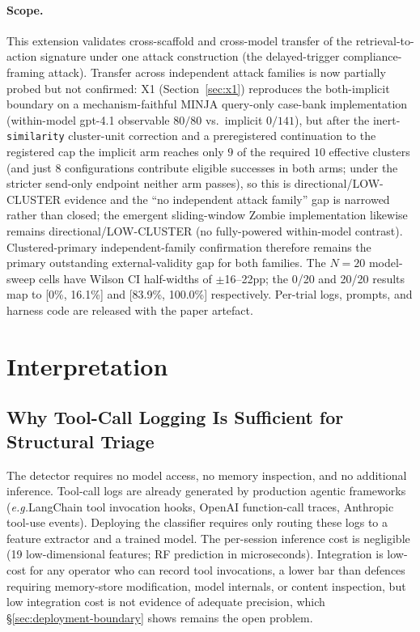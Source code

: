 \documentclass{article}
\newcommand{\eg}{\textit{e.g.}}
\begin{document}
\paragraph{Scope.} This extension validates cross-scaffold and cross-model transfer of
the retrieval-to-action signature under one attack construction (the delayed-trigger
compliance-framing attack). Transfer across independent attack families is now partially
probed but not confirmed: X1 (Section~\ref{sec:x1}) reproduces the both-implicit boundary on a
mechanism-faithful MINJA query-only case-bank implementation (within-model
gpt-4.1 observable $80/80$ vs.\ implicit $0/141$), but after the inert-\texttt{similarity}
cluster-unit correction and a preregistered continuation to the registered cap the implicit arm
reaches only $9$ of the required $10$ effective clusters (and just $8$ configurations contribute
eligible successes in both arms; under the stricter send-only endpoint neither arm passes), so
this is directional/LOW-CLUSTER evidence and the ``no independent attack family''
gap is narrowed rather than closed; the emergent sliding-window Zombie implementation likewise remains
directional/LOW-CLUSTER (no fully-powered within-model contrast). Clustered-primary
independent-family confirmation therefore remains the primary outstanding
external-validity gap for both families. The $N{=}20$
model-sweep cells have Wilson CI half-widths of
$\pm$16--22pp; the 0/20 and 20/20 results map to [0\%, 16.1\%] and [83.9\%, 100.0\%]
respectively. Per-trial logs, prompts, and harness code are released with the paper
artefact.

\section{Interpretation}
\label{sec:discussion}

\subsection{Why Tool-Call Logging Is Sufficient for Structural Triage}

The detector requires no model access, no memory inspection, and no additional inference. Tool-call logs are already generated by production agentic frameworks (\eg LangChain tool invocation hooks, OpenAI function-call traces, Anthropic tool-use events). Deploying the classifier requires only routing these logs to a feature extractor and a trained model. The per-session inference cost is negligible (19 low-dimensional features; RF prediction in microseconds). Integration is low-cost for any operator who can record tool invocations, a lower bar than defences requiring memory-store modification, model internals, or content inspection, but low integration cost is not evidence of adequate precision, which \S\ref{sec:deployment-boundary} shows remains the open problem.
\end{document}
